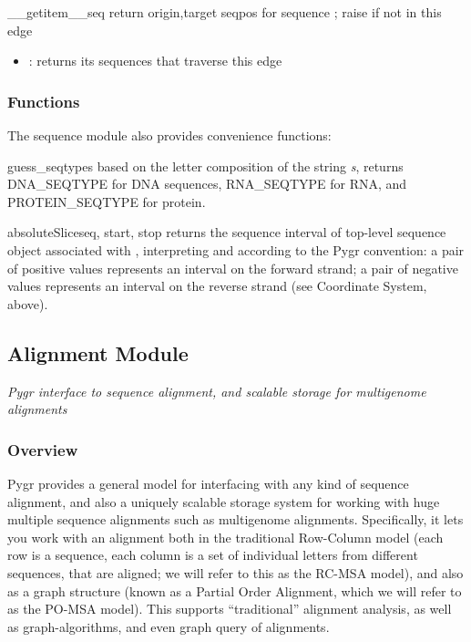 \documentclass{howto}
\begin{document}
\begin{funcdesc}{__getitem__}{seq}
  return origin,target seqpos for sequence ;
  raise  if not in this edge
\end{funcdesc}

\begin{itemize}
\item
{}: returns its sequences that traverse this edge
\end{itemize}


\subsubsection{Functions}
The sequence module also provides convenience functions:

\begin{funcdesc}{guess_seqtype}{s}
  based on the letter composition of
  the string {\em s}, returns DNA_SEQTYPE for DNA sequences, 
  RNA_SEQTYPE for RNA, and PROTEIN_SEQTYPE for protein.
\end{funcdesc}

\begin{funcdesc}{absoluteSlice}{seq, start, stop}
  returns the sequence interval of top-level sequence object associated
  with , interpreting  and  according to
  the Pygr convention: a pair of positive values represents an interval
  on the forward strand; a pair of negative values represents an
  interval on the reverse strand (see Coordinate System, above).
\end{funcdesc}




\subsection{Alignment Module}
\label{seqdb}

{\em Pygr interface to sequence alignment, and scalable storage for multigenome alignments}


\subsubsection{Overview}

Pygr provides a general model for interfacing with any kind of sequence alignment,
and also a uniquely scalable storage system for working with huge multiple sequence
alignments such as multigenome alignments.  Specifically, it lets you work with
an alignment both in the traditional Row-Column model (each row is a sequence, each
column is a set of individual letters from different sequences, that are aligned;
we will refer to this as the RC-MSA model), and also
as a graph structure (known as a Partial Order Alignment, which we will refer to as
the PO-MSA model).  This supports ``traditional'' alignment analysis, as well
as graph-algorithms, and even graph query of alignments.
\end{document}
